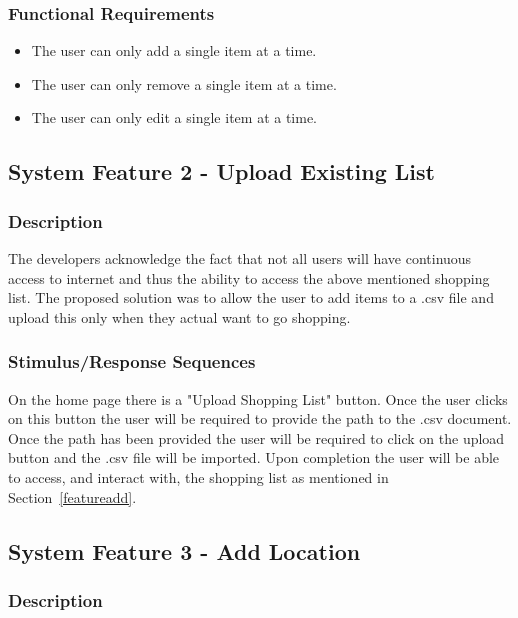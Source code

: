 \documentclass[10pt, a4paper, onecolumn]{scrartcl}
\begin{document}
			\subsubsection{Functional Requirements}
			
				\begin{itemize}
					\item The user can only add a single item at a time.
					\item The user can only remove a single item at a time.
					\item The user can only edit a single item at a time.
				\end{itemize}
			
		
		\subsection{System Feature 2 - Upload Existing List}
			
			\subsubsection{Description}
			
				The developers acknowledge the fact that not all users will have continuous access to internet and thus the ability to access the above mentioned shopping list. The proposed solution was to allow the user to add items to a .csv file and upload this only when they actual want to go shopping. 
				
			\subsubsection{Stimulus/Response Sequences}
			
				On the home page there is a "Upload Shopping List" button. Once the user clicks on this button the user will be required to provide the path to the .csv document. Once the path has been provided the user will be required to click on the upload button and the .csv file will be imported. Upon completion the user will be able to access, and interact with, the shopping list as mentioned in Section~\ref{featureadd}.
		
		\subsection{System Feature 3 - Add Location}
				
			\subsubsection{Description}
			
\end{document}
